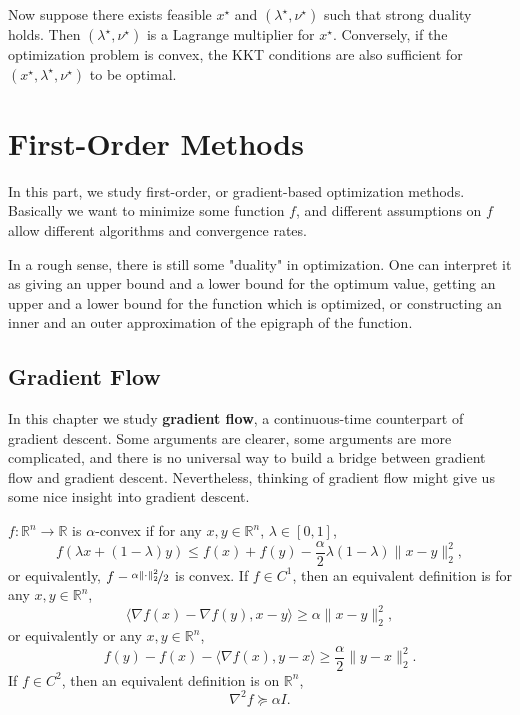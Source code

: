 \documentclass[openany]{book}
\theoremstyle{definition}
\theoremstyle{remark}
\begin{document}
Now suppose there exists feasible $x^{\star}$ and $(\lambda^{\star},\nu^{\star})$ such that strong duality holds. Then $(\lambda^{\star},\nu^{\star})$ is a Lagrange multiplier for $x^{\star}$. Conversely, if the optimization problem is convex, the KKT conditions are also sufficient for $(x^{\star},\lambda^{\star},\nu^{\star})$ to be optimal.

\part{First-Order Methods}
In this part, we study first-order, or gradient-based optimization methods. Basically we want to minimize some function $f$, and different assumptions on $f$ allow different algorithms and convergence rates.

In a rough sense, there is still some "duality" in optimization. One can interpret it as giving an upper bound and a lower bound for the optimum value, getting an upper and a lower bound for the function which is optimized, or constructing an inner and an outer approximation of the epigraph of the function.

\chapter{Gradient Flow}
In this chapter we study \textbf{gradient flow}, a continuous-time counterpart of gradient descent. Some arguments are clearer, some arguments are more complicated, and there is no universal way to build a bridge between gradient flow and gradient descent. Nevertheless, thinking of gradient flow might give us some nice insight into gradient descent.

$f:\mathbb{R}^n\to \mathbb{R}$ is $\alpha$-convex if for any $x,y\in \mathbb{R}^n$, $\lambda\in[0,1]$,
\begin{equation*}
    f\left(\lambda x+(1-\lambda)y\right)\le f(x)+f(y)-\frac{\alpha}{2}\lambda(1-\lambda)\|x-y\|_2^2,
\end{equation*}
or equivalently, $f-\nicefrac{\alpha\|\cdot\|_2^2}{2}$ is convex. If $f\in C^1$, then an equivalent definition is for any $x,y\in \mathbb{R}^n$,
\begin{equation*}
    \langle\nabla f(x)-\nabla f(y),x-y\rangle\ge\alpha\|x-y\|_2^2,
\end{equation*}
or equivalently or any $x,y\in \mathbb{R}^n$,
\begin{equation*}
    f(y)-f(x)-\langle\nabla f(x),y-x\rangle\ge \frac{\alpha}{2}\|y-x\|_2^2.
\end{equation*}
If $f\in C^2$, then an equivalent definition is on $\mathbb{R}^n$,
\begin{equation*}
    \nabla^2f\succeq\alpha I.
\end{equation*}
\end{document}
